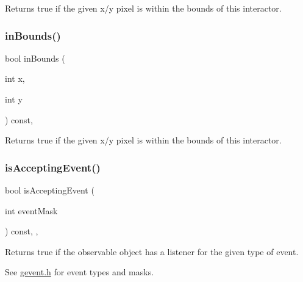 Returns true if the given x/y pixel is within the bounds of this interactor. 

\mbox{\label{classGInteractor_ae6d7982c1c627b677a5e776ca86118ed}} 
\subsubsection{\texorpdfstring{in\+Bounds()}{inBounds()}\hspace{0.1cm}{\footnotesize\ttfamily [2/2]}}
{\footnotesize\ttfamily bool in\+Bounds (\begin{DoxyParamCaption}\item[{int}]{x,  }\item[{int}]{y }\end{DoxyParamCaption}) const\hspace{0.3cm}{\ttfamily [virtual]}, {\ttfamily [inherited]}}



Returns true if the given x/y pixel is within the bounds of this interactor. 

\mbox{\label{classGObservable_aeec1adc19aa0f33de62390686ee1382c}} 
\subsubsection{\texorpdfstring{is\+Accepting\+Event()}{isAcceptingEvent()}\hspace{0.1cm}{\footnotesize\ttfamily [1/3]}}
{\footnotesize\ttfamily bool is\+Accepting\+Event (\begin{DoxyParamCaption}\item[{int}]{event\+Mask }\end{DoxyParamCaption}) const\hspace{0.3cm}{\ttfamily [protected]}, {\ttfamily [virtual]}, {\ttfamily [inherited]}}



Returns true if the observable object has a listener for the given type of event. 

See \mbox{\hyperlink{gevent_8h_source}{gevent.\+h}} for event types and masks. \mbox{\label{classGObservable_aa31c73145a29dcb92848a92e0cfaea41}} 

